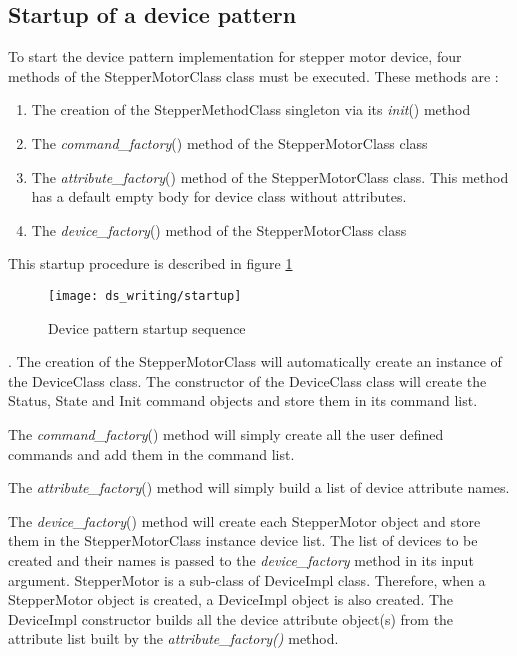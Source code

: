 \subsection{Startup of a device pattern}
\label{Pattern startup}

To start the device pattern implementation for stepper motor device,
four methods of the StepperMotorClass class must be executed. These
methods are :
\begin{enumerate}
\item The creation of the StepperMethodClass singleton
via its \emph{init}() method
\item The \emph{command\_factory}() method of the
StepperMotorClass class
\item The \emph{attribute\_factory}() method of
the StepperMotorClass class. This method has a default empty body
for device class without attributes.
\item The \emph{device\_factory}() method of the
StepperMotorClass class
\end{enumerate}
This startup procedure is described in figure \ref{pattern_startup_fig}
\begin{figure}
\begin{centering}
\texttt{[image: ds\_writing/startup]}
\par\end{centering}

\protect\caption{Device pattern startup sequence}
\label{pattern_startup_fig}
\end{figure}
 . The creation of the StepperMotorClass will automatically create
an instance of the DeviceClass class. The constructor of the DeviceClass
class will create the Status, State and
Init command objects and store them in its command list.

The \emph{command\_factory}() method will simply create all the user
defined commands and add them in the command list.

The \emph{attribute\_factory}() method will simply build a list of
device attribute names.

The \emph{device\_factory}() method will create each StepperMotor
object and store them in the StepperMotorClass instance device list.
The list of devices to be created and their names is passed to the
\emph{device\_factory} method in its input argument. StepperMotor
is a sub-class of DeviceImpl class. Therefore, when a StepperMotor
object is created, a DeviceImpl object is also created. The DeviceImpl
constructor builds all the device attribute object(s) from the attribute
list built by the \emph{attribute\_factory()} method.


